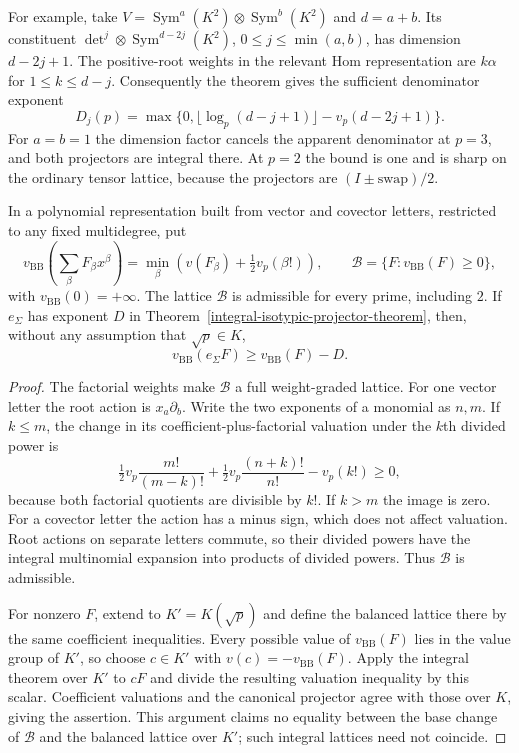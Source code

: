 For example, take $V=\operatorname{Sym}^a(K^2)\otimes
\operatorname{Sym}^b(K^2)$ and $d=a+b$.  Its constituent
$\det^j\otimes\operatorname{Sym}^{d-2j}(K^2)$,
$0\le j\le\min(a,b)$, has dimension $d-2j+1$.  The positive-root
weights in the relevant Hom representation are $k\alpha$ for
$1\le k\le d-j$.  Consequently the theorem gives the sufficient
denominator exponent
\begin{equation}\label{integral-isotypic-gl2-bound}
 D_j(p)=\max\{0,\lfloor\log_p(d-j+1)\rfloor-v_p(d-2j+1)\}.
\end{equation}
For $a=b=1$ the dimension factor cancels the apparent denominator
at $p=3$, and both projectors are integral there.  At $p=2$ the
bound is one and is sharp on the ordinary tensor lattice, because
the projectors are $(I\pm\mathrm{swap})/2$.

\begin{corollary}
\label{integral-isotypic-balanced-fock}
In a polynomial representation built from vector and covector
letters, restricted to any fixed multidegree, put
\[
 v_{\mathrm{BB}}\left(\sum_\beta F_\beta x^\beta\right)
     =\min_\beta\left(v(F_\beta)+\tfrac12v_p(\beta!)\right),
 \qquad \mathcal B=\{F:v_{\mathrm{BB}}(F)\ge0\},
\]
with $v_{\mathrm{BB}}(0)=+\infty$.  The lattice $\mathcal B$ is
admissible for every prime, including $2$.  If $e_\Sigma$ has
exponent $D$ in Theorem~\ref{integral-isotypic-projector-theorem},
then, without any assumption that $\sqrt p\in K$,
\[
       v_{\mathrm{BB}}(e_\Sigma F)\ge v_{\mathrm{BB}}(F)-D.
\]
\end{corollary}

\begin{proof}
The factorial weights make $\mathcal B$ a full weight-graded lattice.
For one vector letter the root action is $x_a\partial_b$.  Write
the two exponents of a monomial as $n,m$.  If $k\le m$, the change
in its coefficient-plus-factorial valuation under the $k$th divided
power is
\[
 \tfrac12v_p\frac{m!}{(m-k)!}
 +\tfrac12v_p\frac{(n+k)!}{n!}-v_p(k!)\ge0,
\]
because both factorial quotients are divisible by $k!$.  If $k>m$
the image is zero.  For a covector letter the action has a minus
sign, which does not affect valuation.  Root actions on separate
letters commute, so their divided powers have the integral
multinomial expansion into products of divided powers.  Thus
$\mathcal B$ is admissible.

For nonzero $F$, extend to $K'=K(\sqrt p)$ and define the balanced
lattice there by the same coefficient inequalities.  Every possible
value of $v_{\mathrm{BB}}(F)$ lies in the value group of $K'$, so
choose $c\in K'$ with $v(c)=-v_{\mathrm{BB}}(F)$.  Apply the
integral theorem over $K'$ to $cF$ and divide the resulting
valuation inequality by this scalar.  Coefficient valuations and
the canonical projector agree with those over $K$, giving the
assertion.  This argument claims no equality between the base
change of $\mathcal B$ and the balanced lattice over $K'$;
such integral lattices need not coincide.
\end{proof}

